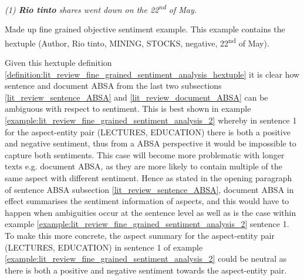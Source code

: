 \begin{example}
\textit{(1) \textbf{Rio tinto} shares went down on the 22\textsuperscript{nd} of May.}
\caption{Made up fine grained objective sentiment example. This example contains the hextuple (Author, Rio tinto, MINING, STOCKS, negative, 22\textsuperscript{nd} of May).}
\label{example:lit_review_fine_grained_sentiment_analysis_3}
\end{example}

Given this hextuple definition \ref{definition:lit_review_fine_grained_sentiment_analysis_hextuple} it is clear how sentence and document ABSA from the last two subsections \ref{lit_review_sentence_ABSA} and \ref{lit_review_document_ABSA} can be ambiguous with respect to sentiment. This is best shown in example \ref{example:lit_review_fine_grained_sentiment_analysis_2} whereby in sentence 1 for the aspect-entity pair (LECTURES, EDUCATION) there is both a positive and negative sentiment, thus from a ABSA perspective it would be impossible to capture both sentiments. This case will become more problematic with longer texts e.g. document ABSA, as they are more likely to contain multiple of the same aspect with different sentiment. Hence as stated in the opening paragraph of sentence ABSA subsection \ref{lit_review_sentence_ABSA}, document ABSA in effect summarises the sentiment information of aspects, and this would have to happen when ambiguities occur at the sentence level as well as is the case within example \ref{example:lit_review_fine_grained_sentiment_analysis_2} sentence 1. To make this more concrete, the aspect summary for the aspect-entity pair (LECTURES, EDUCATION) in sentence 1 of  example \ref{example:lit_review_fine_grained_sentiment_analysis_2} could be neutral as there is both a positive and negative sentiment towards the aspect-entity pair.

